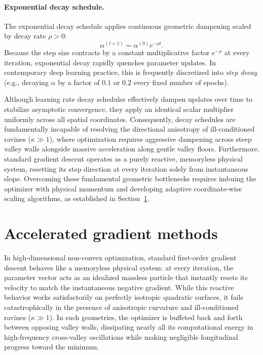 \paragraph{Exponential decay schedule.}
The exponential decay schedule applies continuous geometric dampening scaled by decay rate $\rho > 0$:
\begin{equation}
\alpha^{(t+1)} = \alpha^{(0)} e^{-\rho t}.
\label{eq:exponential_decay_schedule}
\end{equation}
Because the step size contracts by a constant multiplicative factor $e^{-\rho}$ at every iteration, exponential decay rapidly quenches parameter updates. In contemporary deep learning practice, this is frequently discretized into \emph{step decay} (e.g., decaying $\alpha$ by a factor of $0.1$ or $0.2$ every fixed number of epochs).

Although learning rate decay schedules effectively dampen updates over time to stabilize asymptotic convergence, they apply an identical scalar multiplier uniformly across all spatial coordinates. Consequently, decay schedules are fundamentally incapable of resolving the directional anisotropy of ill-conditioned ravines ($\kappa \gg 1$), where optimization requires aggressive dampening across steep valley walls alongside massive acceleration along gentle valley floors. Furthermore, standard gradient descent operates as a purely reactive, memoryless physical system, resetting its step direction at every iteration solely from instantaneous slope. Overcoming these fundamental geometric bottlenecks requires imbuing the optimizer with physical momentum and developing adaptive coordinate-wise scaling algorithms, as established in Section~\ref{sec:first_order_acceleration_methods}.

\section{Accelerated gradient methods}
\label{sec:first_order_acceleration_methods}

In high-dimensional non-convex optimization, standard first-order gradient descent behaves like a memoryless physical system: at every iteration, the parameter vector acts as an idealized massless particle that instantly resets its velocity to match the instantaneous negative gradient. While this reactive behavior works satisfactorily on perfectly isotropic quadratic surfaces, it fails catastrophically in the presence of anisotropic curvature and ill-conditioned ravines ($\kappa \gg 1$). In such geometries, the optimizer is buffeted back and forth between opposing valley walls, dissipating nearly all its computational energy in high-frequency cross-valley oscillations while making negligible longitudinal progress toward the minimum.

